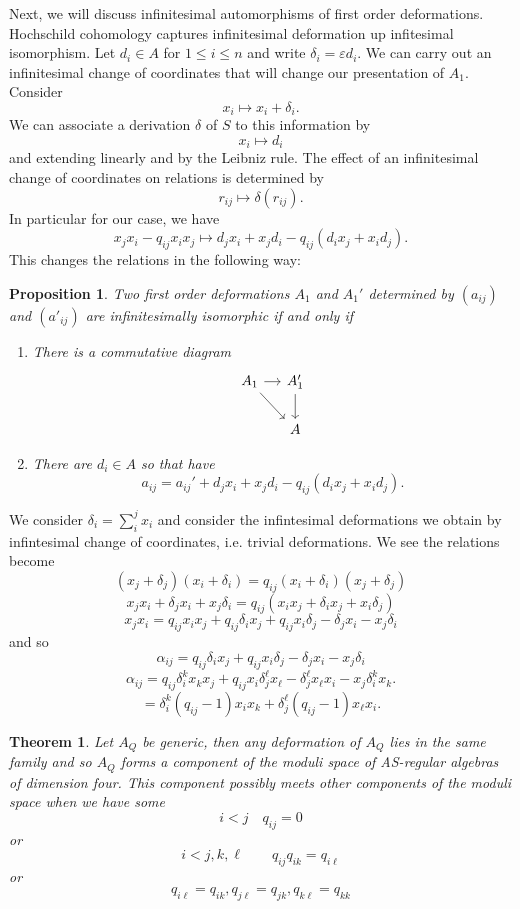 \documentclass[12]{article}
\newtheorem{proposition}{Proposition}
\newtheorem{theorem}{Theorem}
\begin{document}
Next, we will discuss infinitesimal automorphisms of first order deformations.  Hochschild cohomology captures infinitesimal deformation up infitesimal isomorphism.  Let $d_i \in A$ for $1 \leq i \leq n$ and write $\delta_i = \varepsilon d_i$.  We can carry out an infinitesimal change of coordinates that will change our presentation of $A_1$.
Consider
$$x_i \mapsto x_i+\delta_i.$$
We can associate a derivation $\delta$ of $S$ to this information by
$$x_i \mapsto d_i$$ and extending linearly and by the Leibniz rule.
The effect of an infinitesimal change of coordinates on relations is determined
by $$ r_{ij} \mapsto \delta(r_{ij}).$$
In particular for our case, we have
$$ x_jx_i - q_{ij} x_ix_j \mapsto d_jx_i+x_jd_i -q_{ij} (d_i x_j+
x_id_j).$$
This changes the relations in the following way:
\begin{proposition}
Two first order deformations $A_1$ and $A_1'$ determined by
$(a_{ij})$ and $(a'_{ij})$ are infinitesimally isomorphic
  if and only if
  \begin{enumerate}
  \item There is a commutative diagram
   $$\begin{tikzcd}[column sep=small]
A_1 \arrow{r}  \arrow{rd} 
  & A_1' \arrow{d} \\
    & A
\end{tikzcd}$$
\item There are $d_i \in A$ so that
  have $$
  a_{ij} = a_{ij}' + d_j x_i + x_j d_i -q_{ij}(d_i x_j + x_id_j).$$
  \end{enumerate}
\end{proposition}

We consider $\delta_i = \sum^j_i x_i$ and consider the infintesimal deformations we obtain by infintesimal change of coordinates, i.e. trivial deformations.
We see the relations become
$$(x_j+\delta_j) (x_i+\delta_i) = q_{ij}(x_i + \delta_i)(x_j+\delta_j)$$
$$x_jx_i + \delta_jx_i + x_j\delta_i =q_{ij}(x_ix_j + \delta_ix_j + x_i\delta_j)$$
$$x_jx_i = q_{ij} x_ix_j+q_{ij}\delta_ix_j +q_{ij} x_i\delta_j - \delta_jx_i - x_j\delta_i$$
and so
$$\alpha_{ij} =  q_{ij}\delta_ix_j +q_{ij} x_i\delta_j - \delta_jx_i - x_j\delta_i$$
$$ \alpha_{ij} = q_{ij}\delta_i^kx_kx_j +q_{ij} x_i\delta_j^\ell x_\ell - \delta_j^\ell x_\ell x_i - x_j\delta_i^k x_k.$$
$$ = \delta_i^k(q_{ij}-1)x_ix_k + \delta_j^\ell (q_{i j} -1)x_\ell x_i.$$

\begin{theorem}
  Let $A_Q$ be generic, then any deformation of $A_Q$ lies in the same family and so $A_Q$ forms a component of the moduli space of AS-regular algebras of dimension four.  This component possibly meets other components of the moduli space when we have some 
  $$i<j \quad q_{ij} = 0$$
  or $$i<j,k,\ell \quad \quad q_{ij}q_{ik} = q_{i\ell}$$
  or
 $$q_{i\ell} = q_{ik},q_{j\ell} = q_{jk}, q_{k\ell} = q_{kk}$$
\end{theorem}
\end{document}
